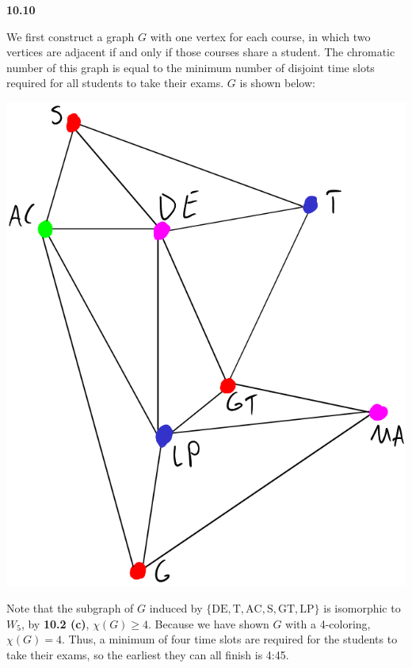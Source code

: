 \documentclass[12pt]{article}
\begin{document}
\newpage
\medskip\noindent\textbf{10.10}

    We first construct a graph $G$ with one vertex for each course, in which two vertices are adjacent if and only if those courses share a student.
    The chromatic number of this graph is equal to the minimum number of disjoint time slots required for all students to take their exams.
    $G$ is shown below:
    \begin{center}\includegraphics[scale=.5]{fig3.png}\end{center}
        Note that the subgraph of $G$ induced by $\{\text{DE}, \text{T}, \text{AC}, \text{S}, \text{GT}, \text{LP}\}$ is isomorphic to $W_5$, by \textbf{10.2 (c)}, $\chi(G) \geq 4$.
    Because we have shown $G$ with a 4-coloring, $\chi(G) = 4$.
    Thus, a minimum of four time slots are required for the students to take their exams, so the earliest they can all finish is 4:45.
\end{document}
